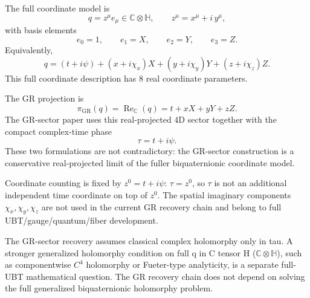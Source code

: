 \documentclass[12pt,a4paper]{article}
\begin{document}
The full coordinate model is
\[
q = z^\mu e_\mu \in \mathbb{C}\otimes\mathbb{H},\qquad
z^\mu = x^\mu + i\,y^\mu,
\]
with basis elements
\[
e_0 = 1,\qquad e_1 = X,\qquad e_2 = Y,\qquad e_3 = Z.
\]
Equivalently,
\[
q = (t+i\psi) + (x+i\chi_x)X + (y+i\chi_y)Y + (z+i\chi_z)Z.
\]
This full coordinate description has \(8\) real coordinate parameters.

The GR projection is
\[
\pi_{\mathrm{GR}}(q)=\operatorname{Re}_{\mathbb{C}}(q)=t+xX+yY+zZ.
\]
The GR-sector paper uses this real-projected \(4\)D sector together with the compact complex-time phase
\[
\tau=t+i\psi.
\]
These two formulations are not contradictory: the GR-sector construction is a conservative real-projected limit of the fuller biquaternionic coordinate model.

Coordinate counting is fixed by \(z^0=t+i\psi\): \(\tau=z^0\), so \(\tau\) is not an additional independent time coordinate on top of \(z^0\).
The spatial imaginary components \(\chi_x,\chi_y,\chi_z\) are not used in the current GR recovery chain and belong to full UBT/gauge/quantum/fiber development.

The GR-sector recovery assumes classical complex holomorphy only in tau.
A stronger generalized holomorphy condition on full q in C tensor H (\(\mathbb{C}\otimes\mathbb{H}\)), such as componentwise \(C^4\) holomorphy or Fueter-type analyticity, is a separate full-UBT mathematical question.
The GR recovery chain does not depend on solving the full generalized biquaternionic holomorphy problem.
\end{document}

